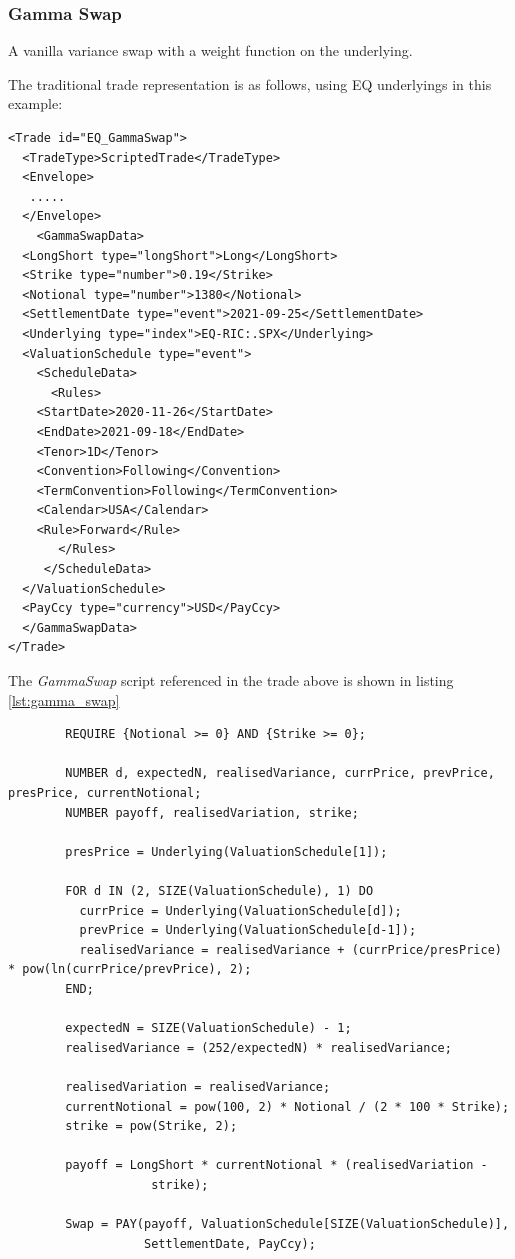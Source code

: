 \subsubsection{Gamma Swap}

A vanilla variance swap with a weight function on the underlying.

The traditional trade representation is as follows, using EQ underlyings in this example:

\begin{verbatim}
<Trade id="EQ_GammaSwap">
  <TradeType>ScriptedTrade</TradeType>
  <Envelope>
   .....
  </Envelope>
    <GammaSwapData>
  <LongShort type="longShort">Long</LongShort>
  <Strike type="number">0.19</Strike>
  <Notional type="number">1380</Notional>
  <SettlementDate type="event">2021-09-25</SettlementDate>
  <Underlying type="index">EQ-RIC:.SPX</Underlying>
  <ValuationSchedule type="event">
    <ScheduleData>
      <Rules>
    <StartDate>2020-11-26</StartDate>
    <EndDate>2021-09-18</EndDate>
    <Tenor>1D</Tenor>
    <Convention>Following</Convention>
    <TermConvention>Following</TermConvention>
    <Calendar>USA</Calendar>
    <Rule>Forward</Rule>
       </Rules>
     </ScheduleData>
  </ValuationSchedule>
  <PayCcy type="currency">USD</PayCcy>
  </GammaSwapData>
</Trade>
\end{verbatim}

The \emph{GammaSwap} script referenced in the trade above is shown in listing
\ref{lst:gamma_swap}

\begin{listing}[hbt]
\begin{verbatim}
        REQUIRE {Notional >= 0} AND {Strike >= 0};

        NUMBER d, expectedN, realisedVariance, currPrice, prevPrice, presPrice, currentNotional;
        NUMBER payoff, realisedVariation, strike;

        presPrice = Underlying(ValuationSchedule[1]);

        FOR d IN (2, SIZE(ValuationSchedule), 1) DO
          currPrice = Underlying(ValuationSchedule[d]);
          prevPrice = Underlying(ValuationSchedule[d-1]);
          realisedVariance = realisedVariance + (currPrice/presPrice) * pow(ln(currPrice/prevPrice), 2);
        END;

        expectedN = SIZE(ValuationSchedule) - 1;
        realisedVariance = (252/expectedN) * realisedVariance;

        realisedVariation = realisedVariance;
        currentNotional = pow(100, 2) * Notional / (2 * 100 * Strike);
        strike = pow(Strike, 2);

        payoff = LongShort * currentNotional * (realisedVariation -
                    strike);

        Swap = PAY(payoff, ValuationSchedule[SIZE(ValuationSchedule)],
                   SettlementDate, PayCcy);
\end{verbatim}
\caption{Payoff script for a GammaSwap.}
\label{lst:gamma_swap}
\end{listing}

